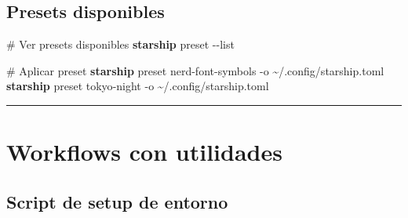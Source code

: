 \documentclass[
  11pt,
  letterpaper,
  oneside,
  openany]{scrbook}
\newenvironment{Shaded}{}{}
\newcommand{\AttributeTok}[1]{\textcolor[rgb]{0.84,0.23,0.29}{#1}}
\newcommand{\CommentTok}[1]{\textcolor[rgb]{0.42,0.45,0.49}{#1}}
\newcommand{\ExtensionTok}[1]{\textcolor[rgb]{0.84,0.23,0.29}{\textbf{#1}}}
\newcommand{\NormalTok}[1]{\textcolor[rgb]{0.14,0.16,0.18}{#1}}
\begin{document}
\subsection{Presets disponibles}\label{presets-disponibles}

\begin{Shaded}
\begin{Highlighting}[]
\CommentTok{\# Ver presets disponibles}
\ExtensionTok{starship}\NormalTok{ preset }\AttributeTok{{-}{-}list}

\CommentTok{\# Aplicar preset}
\ExtensionTok{starship}\NormalTok{ preset nerd{-}font{-}symbols }\AttributeTok{{-}o}\NormalTok{ \textasciitilde{}/.config/starship.toml}
\ExtensionTok{starship}\NormalTok{ preset tokyo{-}night }\AttributeTok{{-}o}\NormalTok{ \textasciitilde{}/.config/starship.toml}
\end{Highlighting}
\end{Shaded}

\begin{center}\rule{0.5\linewidth}{0.5pt}\end{center}

\section{Workflows con utilidades}\label{workflows-con-utilidades}

\subsection{Script de setup de
entorno}\label{script-de-setup-de-entorno}
\end{document}
